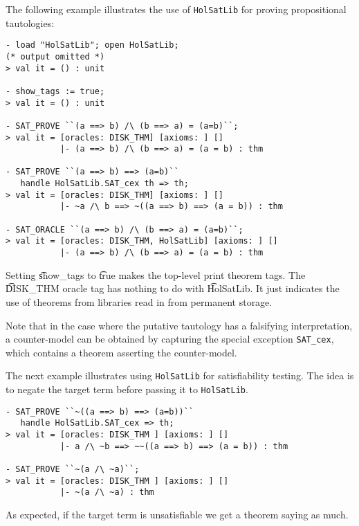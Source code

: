 The following example illustrates the use of {\tt{HolSatLib}} for proving propositional tautologies:

\begin{session}
\begin{verbatim}
- load "HolSatLib"; open HolSatLib;
(* output omitted *)
> val it = () : unit

- show_tags := true;
> val it = () : unit

- SAT_PROVE ``(a ==> b) /\ (b ==> a) = (a=b)``;
> val it = [oracles: DISK_THM] [axioms: ] []
           |- (a ==> b) /\ (b ==> a) = (a = b) : thm

- SAT_PROVE ``(a ==> b) ==> (a=b)``
   handle HolSatLib.SAT_cex th => th;
> val it = [oracles: DISK_THM] [axioms: ] []
           |- ~a /\ b ==> ~((a ==> b) ==> (a = b)) : thm

- SAT_ORACLE ``(a ==> b) /\ (b ==> a) = (a=b)``;
> val it = [oracles: DISK_THM, HolSatLib] [axioms: ] []
           |- (a ==> b) /\ (b ==> a) = (a = b) : thm
\end{verbatim}
\end{session}

Setting \t{show\_tags} to \t{true} makes the \HOL{} top-level print theorem tags. The \t{DISK\_THM} oracle tag has nothing to do with \t{HolSatLib}. It just indicates the use of theorems from \HOL{} libraries read in from permanent storage.

Note that in the case where the putative tautology has a falsifying interpretation, a counter-model can be obtained by capturing the special exception {\tt{SAT\_cex}}, which contains a theorem asserting the counter-model.

The next example illustrates using {\tt{HolSatLib}} for satisfiability testing. The idea is to negate the target term before passing it to {\tt{HolSatLib}}.

\begin{session}
\begin{verbatim}
- SAT_PROVE ``~((a ==> b) ==> (a=b))``
   handle HolSatLib.SAT_cex => th;
> val it = [oracles: DISK_THM ] [axioms: ] []
           |- a /\ ~b ==> ~~((a ==> b) ==> (a = b)) : thm

- SAT_PROVE ``~(a /\ ~a)``;
> val it = [oracles: DISK_THM ] [axioms: ] []
           |- ~(a /\ ~a) : thm
\end{verbatim}
\end{session}

As expected, if the target term is unsatisfiable we get a theorem saying as much.


